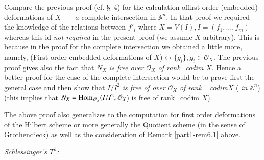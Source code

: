 {\begin{remark}\label{part1-rem6.2}%
Compare the previous proof (cf. \S\ 4) for the calculation
of\pageoriginale first order (embedded) deformations of $X--a$
complete intersection in $\mathbb{A}^{n}$. In that proof we required
the knowledge of the relations between $f'_i$ where $X=V(I),
I=(f_1,\ldots,f_m)$ whereas this id {\em not required} in the present
proof (we assume $X$ arbitrary). This is because in the proof for the
complete intersection we obtained a little more, namely, (First order
embedded deformations of $X$)$\leftrightarrow \{g_i\},
g_i\in \mathscr{O}_X$. The previous proof gives also the fact that
$N_X$ {\em is free over} $\mathscr{O}_X$ {\em of rank=codim}
$X$. Hence a better proof for the case of the complete intersection
would be to prove first the general case and then show that $I/I^{2}$
{\em is free of over} $\mathscr{O}_X$ {\em of rank= codim}$X$ ({\em
in} $\mathbb{A}^{n}$) (this implies that
$N_X=\operatorname{Hom}_{\mathscr{O}_{X}}(I/I^{2}, \mathscr{O}_X$) is free of
rank=codim $X$). 
\end{remark}

\begin{remark}\label{part1-rem6.3}%
The above proof also generalizes to the computation for first order
deformations of the Hilbert scheme or more generally the Quotient
scheme (in the sense of Grothendieck) as well as the consideration of
Remark \ref{part1-rem6.1} above. 
\end{remark}

{\em Schlessinger's $T^{1}$:}

}
